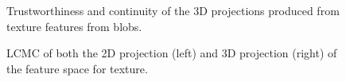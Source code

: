 \begin{figure}[H]
	\centering
	\caption{Trustworthiness and continuity of the 3D projections produced from texture features from blobs.}\label{fig:TC_3d_blobs}
\end{figure}

\begin{figure}[H]
	\centering
	\caption{LCMC of both the 2D projection (left) and 3D projection (right) of the feature space for texture.}\label{fig:LCMC_blobs}
\end{figure}
\clearpage


